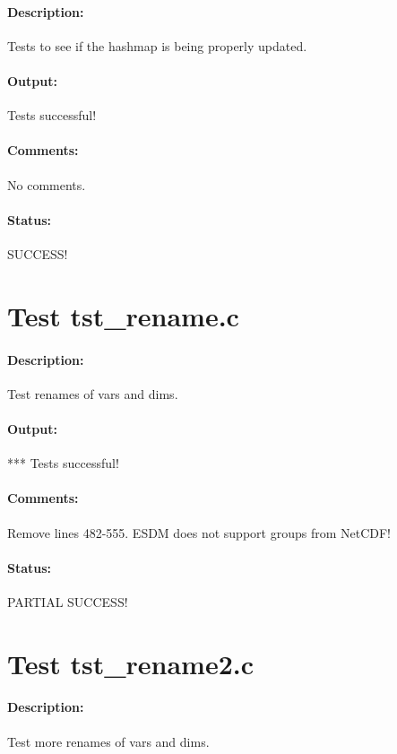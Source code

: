 \paragraph{Description:} Tests to see if the hashmap is being properly updated.

\paragraph{Output:} Tests successful!

\paragraph{Comments:} No comments.

\paragraph{Status:} SUCCESS!

\section{Test tst\_rename.c}

\paragraph{Description:} Test renames of vars and dims.

\paragraph{Output:} *** Tests successful!

\paragraph{Comments:} Remove lines 482-555. ESDM does not support groups from NetCDF!

\paragraph{Status:} PARTIAL SUCCESS!

\section{Test tst\_rename2.c}

\paragraph{Description:} Test more renames of vars and dims.

